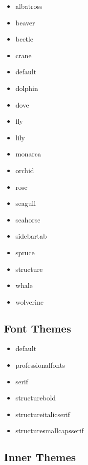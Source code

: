 \ttfamily
\begin{multicols}{4}\raggedcolumns
\begin{itemize}
  \item albatross
  \item beaver
  \item beetle
  \item crane
  \item default
  \item dolphin
  \item dove
  \item fly
  \item lily
  \item monarca
  \item orchid
  \item rose
  \item seagull
  \item seahorse
  \item sidebartab
  \item spruce
  \item structure
  \item whale
  \item wolverine
\end{itemize}
\end{multicols}
\normalfont

\subsection{Font Themes}\label{subsec:font-themes}

\ttfamily
\begin{multicols}{2}\raggedcolumns
\begin{itemize}
  \item default
  \item professionalfonts
  \item serif
  \item structurebold
  \item structureitalicserif
  \item structuresmallcapsserif
\end{itemize}
\end{multicols}
\normalfont

\subsection{Inner Themes}\label{subsec:inner-themes}

